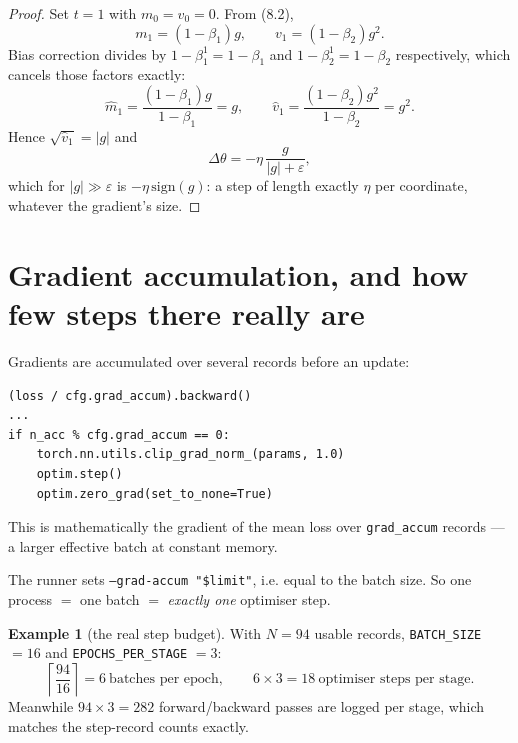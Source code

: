 \documentclass[11pt]{article}
\theoremstyle{definition}
\newtheorem{example}[theorem]{Example}
\begin{document}
\begin{proof}
Set $t=1$ with $m_0 = v_0 = 0$. From (8.2),
\[
m_1 = (1-\beta_1)g,\qquad v_1 = (1-\beta_2)g^2 .
\]
Bias correction divides by $1-\beta_1^{1} = 1-\beta_1$ and $1-\beta_2^{1} = 1-\beta_2$ respectively, which cancels those factors exactly:
\[
\hat m_1 = \frac{(1-\beta_1)g}{1-\beta_1} = g,
\qquad
\hat v_1 = \frac{(1-\beta_2)g^2}{1-\beta_2} = g^2 .
\]
Hence $\sqrt{\hat v_1} = |g|$ and
\[
\Delta\theta = -\eta\,\frac{g}{|g|+\varepsilon},
\]
which for $|g| \gg \varepsilon$ is $-\eta\,\mathrm{sign}(g)$: a step of length exactly $\eta$ per coordinate, whatever the gradient's size.
\end{proof}

\begin{center}
\end{center}

\section{Gradient accumulation, and how few steps there really are}

Gradients are accumulated over several records before an update:
\begin{lstlisting}
(loss / cfg.grad_accum).backward()
...
if n_acc % cfg.grad_accum == 0:
    torch.nn.utils.clip_grad_norm_(params, 1.0)
    optim.step()
    optim.zero_grad(set_to_none=True)
\end{lstlisting}
This is mathematically the gradient of the mean loss over \texttt{grad\_accum} records --- a larger effective batch at constant memory.

The runner sets \texttt{--grad-accum "\$limit"}, i.e. equal to the batch size. So one process $=$ one batch $=$ \emph{exactly one} optimiser step.

\begin{example}[the real step budget]
\label{ex:step-budget}
With $N = 94$ usable records, \texttt{BATCH\_SIZE} $= 16$ and \texttt{EPOCHS\_PER\_STAGE} $= 3$:
\[
\left\lceil \frac{94}{16}\right\rceil = 6\ \text{batches per epoch},
\qquad
6 \times 3 = \boxed{18\ \text{optimiser steps per stage}} .
\]
Meanwhile $94\times3 = 282$ forward/backward passes are logged per stage, which matches the step-record counts exactly.
\end{example}
\end{document}

